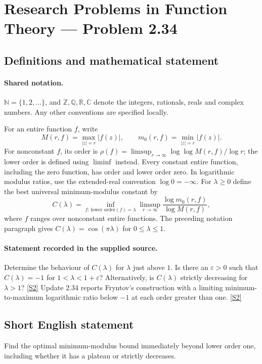 \documentclass[11pt]{article}
\newcommand{\sref}[2]{\hyperlink{source:#1:#2}{[S#2]}}
\begin{document}
\section{Research Problems in Function Theory — Problem 2.34}\label{statement}

\subsection{Definitions and mathematical statement}

\paragraph{Shared notation.}$\mathbb N=\{1,2,\ldots\}$, and $\mathbb Z,\mathbb Q,\mathbb R,\mathbb C$ denote the integers, rationals, reals and complex numbers. Any other conventions are specified locally.


For an entire function $f$, write
\[
 M(r,f)=\max_{|z|=r}|f(z)|,\qquad m_0(r,f)=\min_{|z|=r}|f(z)|.
\]
For nonconstant $f$, its order is $\rho(f)=\limsup_{r\to\infty}\log\log M(r,f)/\log r$;
the lower order is defined using $\liminf$ instead. Every constant entire function, including the zero function, has order and lower order zero. In logarithmic modulus ratios, use the extended-real convention $\log0=-\infty$.
For $\lambda\ge0$ define the best universal minimum-modulus constant by
\[C(\lambda)=\inf_{f:\,\text{lower order}(f)=\lambda}
\limsup_{r\to\infty}\frac{\log m_0(r,f)}{\log M(r,f)},\]
where $f$ ranges over nonconstant entire functions. The preceding notation paragraph gives $C(\lambda)=\cos(\pi\lambda)$ for $0\le\lambda\le1$.

\paragraph{Statement recorded in the supplied source.}
Determine the behaviour of $C(\lambda)$ for $\lambda$ just above $1$. Is there an $\varepsilon>0$ such that $C(\lambda)=-1$ for $1<\lambda<1+\varepsilon$? Alternatively, is $C(\lambda)$ strictly decreasing for $\lambda>1$? \sref{statement}{2}
Update 2.34 reports Fryntov's construction with a limiting minimum-to-maximum logarithmic ratio below $-1$ at each order greater than one. \sref{statement}{2}
\subsection{Short English statement}
Find the optimal minimum-modulus bound immediately beyond lower order one, including whether it has a plateau or strictly decreases.
\end{document}
